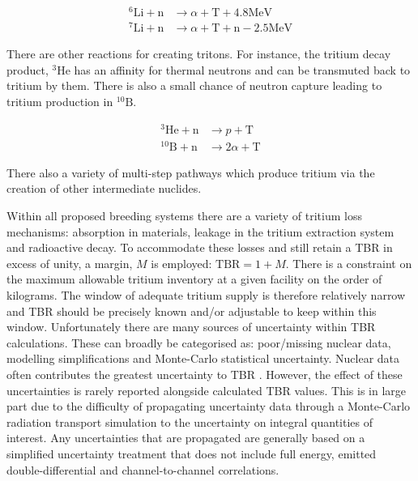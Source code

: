 \begin{equation}
\begin{split}
  ^{6}\mathrm{Li} + \mathrm{n} & \rightarrow \alpha + \mathrm{T} + 4.8\mathrm{MeV} \\
  ^{7}\mathrm{Li} + \mathrm{n} & \rightarrow \alpha + \mathrm{T} + \mathrm{n} - 2.5\mathrm{MeV}
\end{split}
\end{equation}

There are other reactions for creating tritons. For instance, the tritium decay product, $^{3}\mathrm{He}$ has an affinity for thermal neutrons and can be transmuted back to tritium by them. There is also a small chance of neutron capture leading to tritium production in $^{10}\mathrm{B}$.

\begin{equation}
\begin{split}
  ^{3}\mathrm{He} + \mathrm{n} & \rightarrow p + \mathrm{T} \\
  ^{10}\mathrm{B} + \mathrm{n} & \rightarrow 2\alpha + \mathrm{T}
\end{split}
\end{equation}

There also a variety of multi-step pathways which produce tritium via the creation of other intermediate nuclides. 

Within all proposed breeding systems there are a variety of tritium loss mechanisms: absorption in materials, leakage in the tritium extraction system and radioactive decay. To accommodate these losses and still retain a TBR in excess of unity, a margin, $M$ is employed: $\mathrm{TBR} = 1 + M$. There is a constraint on the maximum allowable tritium inventory at a given facility on the order of kilograms. The window of adequate tritium supply is therefore relatively narrow and TBR should be precisely known and/or adjustable to keep within this window. Unfortunately there are many sources of uncertainty within TBR calculations. These can broadly be categorised as: poor/missing nuclear data, modelling simplifications and Monte-Carlo statistical uncertainty. Nuclear data often contributes the greatest uncertainty to TBR \cite{El-Guebaly2009}. However, the effect of these uncertainties is rarely reported alongside calculated TBR values. This is in large part due to the difficulty of propagating uncertainty data through a Monte-Carlo radiation transport simulation to the uncertainty on integral quantities of interest. Any uncertainties that are propagated are generally based on a simplified uncertainty treatment that does not include full energy, emitted double-differential and channel-to-channel correlations. 

